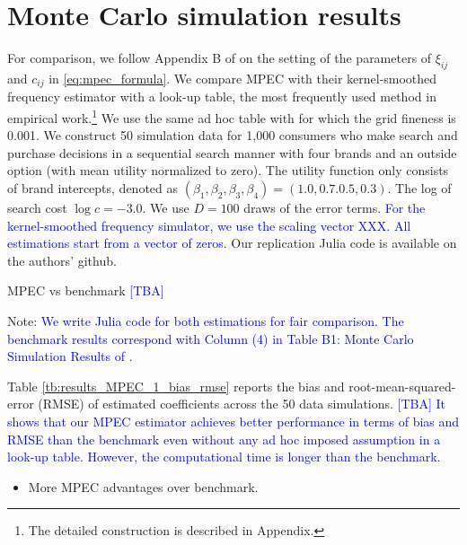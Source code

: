\documentclass[12pt]{article}
\begin{document}
\section{Monte Carlo simulation results}

For comparison, we follow Appendix B of \cite{ursu2023sequential} on the setting of the parameters of $\xi_{ij}$ and $c_{ij}$ in \eqref{eq:mpec_formula}. 
We compare MPEC with their kernel-smoothed frequency estimator with a look-up table, the most frequently used method in empirical work.\footnote{The detailed construction is described in Appendix.} 
We use the same ad hoc table with \cite{ursu2023sequential} for which the grid fineness is 0.001.
We construct 50 simulation data for 1,000 consumers who make search and purchase decisions in a sequential search manner with four brands and an outside option (with mean utility normalized to zero). The utility function only consists of brand intercepts, denoted as $(\beta_1,\beta_2,\beta_3,\beta_4)=(1.0, 0.7. 0.5, 0.3)$. 
The log of search cost $\log c=-3.0$. We use $D=100$ draws of the error terms.
\textcolor{blue}{For the kernel-smoothed frequency simulator, we use the
scaling vector XXX. All estimations start from a vector of zeros. } Our replication Julia code is available on the authors' github.

\begin{table}[!htbp]
  \begin{center}
      \caption{MPEC vs benchmark \textcolor{blue}{[TBA]}}
      \label{tb:results_MPEC_1_bias_rmse} 
      \subfloat[scale $\sigma=20$]{}
      \subfloat[scale ]{}
  \end{center}
  \footnotesize
  Note: \textcolor{blue}{We write Julia code for both estimations for fair comparison. The benchmark results correspond with Column (4) in Table B1: Monte Carlo Simulation Results of \cite{ursu2023sequential}.}
\end{table} 

Table \ref{tb:results_MPEC_1_bias_rmse} reports the bias and root-mean-squared-error (RMSE) of estimated coefficients across the 50 data simulations.
\textcolor{blue}{[TBA] It shows that our MPEC estimator achieves better performance in terms of bias and RMSE than the benchmark even without any ad hoc imposed assumption in a look-up table. 
However, the computational time is longer than the benchmark.}
\begin{itemize}
    \item More MPEC advantages over benchmark.
\end{itemize}
\end{document}
